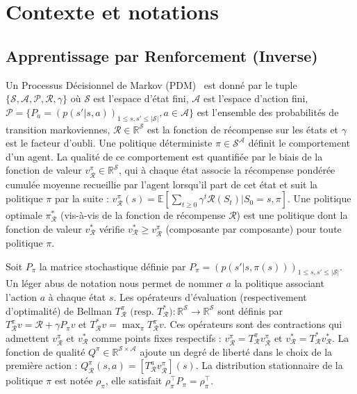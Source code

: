 \documentclass[french,utf8]{./hermes-journal}
\newcommand{\p}{\mathcal{P}}
\newcommand{\R}{\mathcal{R}}
\newcommand{\s}{\mathcal{S}}
\newcommand{\A}{\mathcal{A}}
\newcommand{\E}{\mathbb{E}}
\begin{document}
\section{Contexte et notations}
\label{seackground}

\subsection{Apprentissage par Renforcement (Inverse)}
\label{subseackgrounrl}

Un Processus Décisionnel de Markov (PDM)~\cite{Puterma994} est donné par le tuple $\{\s,\A,\p,\R,\gamma\}$ où $\s$ est l'espace d'état fini, $\A$ est l'espace d'action fini, $\p =
\{P_a = (p(s'|s,a))_{1\leq s,s'\leq |\s|}, a\in\A\}$ est l'ensemble des probabilités de transition markoviennes, $\R\in\mathbb{R}^\s$ est la fonction de récompense sur les états et $\gamma$ est le facteur d'oubli.
Une politique déterministe $\pi\in\s^\A$ définit le comportement d'un agent. La qualité de ce comportement est quantifiée par le biais de la fonction de valeur $v_\R^\pi\in\mathbb{R}^\s$, qui à chaque état associe la récompense pondérée cumulée moyenne recueillie par l'agent lorsqu'il part de cet état et suit la politique $\pi$ par la suite : $v_\R^\pi(s) = \E[\sum_{t\geq 0} \gamma^t \R(S_t)|S_0=s,\pi]$. Une politique optimale $\pi_\R^*$ (vis-à-vis de la fonction de récompense $\R$) est une politique dont la fonction de valeur $v^*_\R$ vérifie $v_\R^* \geq v_\R^\pi$ (composante par composante) pour toute politique $\pi$.

Soit $P_\pi$ la matrice stochastique définie par $P_\pi =
(p(s'|s,\pi(s)))_{1\leq s,s'\leq |\s|}$. Un léger abus de notation nous permet de nommer $a$ la politique associant l'action $a$ à chaque état $s$. Les opérateurs d'évaluation (respectivement d'optimalité) de Bellman $T^\pi_\R\text{ (resp. $T^*_\R$)}:\mathbb{R}^\s
\rightarrow \mathbb{R}^\s$ sont définis par $T^\pi_\R v = \R + \gamma
P_\pi v$ et $T_\R^*v = \max_\pi T_\R^\pi v$.
Ces opérateurs sont des contractions qui admettent $v_\R^\pi$ et $v^*_\R$ comme points fixes respectifs : $v_\R^\pi = T^\pi_\R v_\R^\pi$ et $v^*_\R = T^*_\R v^*_\R$.
La fonction de qualité $Q^\pi\in\mathbb{R}^{\s\times \A}$ ajoute un degré de liberté dans le choix de la première action : $Q_\R^\pi(s,a)
= [T^a_\R v^\pi_\R](s)$. La distribution stationnaire de la politique $\pi$ est notée $\rho_\pi$, elle satisfait $\rho_\pi^\top P_\pi = \rho_\pi^\top$.
\end{document}
